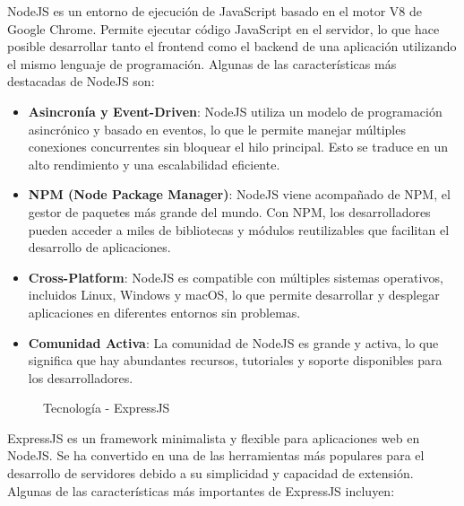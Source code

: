 NodeJS es un entorno de ejecución de JavaScript basado en el motor V8 de Google Chrome. Permite ejecutar código JavaScript en el servidor, lo que hace posible desarrollar tanto el frontend como el backend de una aplicación utilizando el mismo lenguaje de programación. Algunas de las características más destacadas de NodeJS son:

\begin{itemize}

\item \textbf{Asincronía y Event-Driven}: NodeJS utiliza un modelo de programación asincrónico y basado en eventos, lo que le permite manejar múltiples conexiones concurrentes sin bloquear el hilo principal. Esto se traduce en un alto rendimiento y una escalabilidad eficiente.

\item \textbf{NPM (Node Package Manager)}: NodeJS viene acompañado de NPM, el gestor de paquetes más grande del mundo. Con NPM, los desarrolladores pueden acceder a miles de bibliotecas y módulos reutilizables que facilitan el desarrollo de aplicaciones.

\item \textbf{Cross-Platform}: NodeJS es compatible con múltiples sistemas operativos, incluidos Linux, Windows y macOS, lo que permite desarrollar y desplegar aplicaciones en diferentes entornos sin problemas.

\item \textbf{Comunidad Activa}: La comunidad de NodeJS es grande y activa, lo que significa que hay abundantes recursos, tutoriales y soporte disponibles para los desarrolladores.

\end{itemize}

\newpage

\begin{figure}[h]
\centering
 \caption{Tecnología - ExpressJS}
\end{figure}

ExpressJS es un framework minimalista y flexible para aplicaciones web en NodeJS. Se ha convertido en una de las herramientas más populares para el desarrollo de servidores debido a su simplicidad y capacidad de extensión. Algunas de las características más importantes de ExpressJS incluyen:

